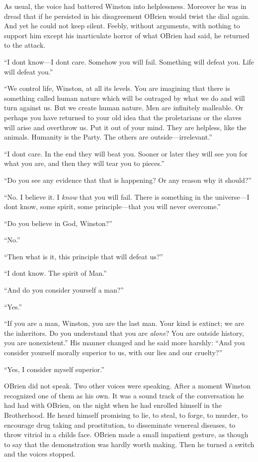 As usual, the voice had battered Winston into helplessness. Moreover he
was in dread that if he persisted in his disagreement
O\textquotesingle Brien would twist the dial again. And yet he could not
keep silent. Feebly, without arguments, with nothing to support him
except his inarticulate horror of what O\textquotesingle Brien had said,
he returned to the attack.

``I don\textquotesingle t know---I don\textquotesingle t care. Somehow
you will fail. Something will defeat you. Life will defeat you.''

``We control life, Winston, at all its levels. You are imagining that
there is something called human nature which will be outraged by what we
do and will turn against us. But we create human nature. Men are
infinitely malleable. Or perhaps you have returned to your old idea that
the proletarians or the slaves will arise and overthrow us. Put it out
of your mind. They are helpless, like the animals. Humanity is the
Party. The others are outside---irrelevant.''

``I don\textquotesingle t care. In the end they will beat you. Sooner or
later they will see you for what you are, and then they will tear you to
pieces.''

``Do you see any evidence that that is happening? Or any reason why it
should?''

``No. I believe it. I \emph{know} that you will fail. There is something
in the universe---I don\textquotesingle t know, some spirit, some
principle---that you will never overcome.''

``Do you believe in God, Winston?''

``No.''

``Then what is it, this principle that will defeat us?''

``I don\textquotesingle t know. The spirit of Man.''

``And do you consider yourself a man?''

``Yes.''

``If you are a man, Winston, you are the last man. Your kind is extinct;
we are the inheritors. Do you understand that you are \emph{alone}? You
are outside history, you are nonexistent.'' His manner changed and he
said more harshly: ``And you consider yourself morally superior to us,
with our lies and our cruelty?''

``Yes, I consider myself superior.''

O\textquotesingle Brien did not speak. Two other voices were speaking.
After a moment Winston recognized one of them as his own. It was a sound
track of the conversation he had had with O\textquotesingle Brien, on
the night when he had enrolled himself in the Brotherhood. He heard
himself promising to lie, to steal, to forge, to murder, to encourage
drug taking and prostitution, to disseminate venereal diseases, to throw
vitriol in a child\textquotesingle s face. O\textquotesingle Brien made
a small impatient gesture, as though to say that the demonstration was
hardly worth making. Then he turned a switch and the voices stopped.

